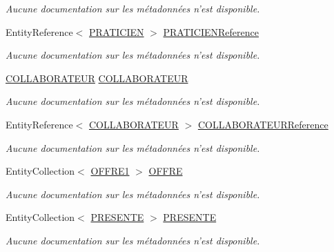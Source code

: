 \begin{DoxyCompactItemize}
\begin{DoxyCompactList}\small\item\em Aucune documentation sur les métadonnées n'est disponible. \end{DoxyCompactList}\item 
Entity\-Reference$<$ \hyperlink{class_model_1_1_p_r_a_t_i_c_i_e_n}{P\-R\-A\-T\-I\-C\-I\-E\-N} $>$ \hyperlink{class_model_1_1_r_a_p_p_o_r_t___d_e___v_i_s_i_t_e_a54eeb4d8f7c4a50370f1803ba841a36a}{P\-R\-A\-T\-I\-C\-I\-E\-N\-Reference}
\begin{DoxyCompactList}\small\item\em Aucune documentation sur les métadonnées n'est disponible. \end{DoxyCompactList}\item 
\hyperlink{class_model_1_1_c_o_l_l_a_b_o_r_a_t_e_u_r}{C\-O\-L\-L\-A\-B\-O\-R\-A\-T\-E\-U\-R} \hyperlink{class_model_1_1_r_a_p_p_o_r_t___d_e___v_i_s_i_t_e_ae2e3abe90339d6fbacb2990f382c9380}{C\-O\-L\-L\-A\-B\-O\-R\-A\-T\-E\-U\-R}
\begin{DoxyCompactList}\small\item\em Aucune documentation sur les métadonnées n'est disponible. \end{DoxyCompactList}\item 
Entity\-Reference$<$ \hyperlink{class_model_1_1_c_o_l_l_a_b_o_r_a_t_e_u_r}{C\-O\-L\-L\-A\-B\-O\-R\-A\-T\-E\-U\-R} $>$ \hyperlink{class_model_1_1_r_a_p_p_o_r_t___d_e___v_i_s_i_t_e_a14d1d3b1a7760c1c07bd940a84cb3a32}{C\-O\-L\-L\-A\-B\-O\-R\-A\-T\-E\-U\-R\-Reference}
\begin{DoxyCompactList}\small\item\em Aucune documentation sur les métadonnées n'est disponible. \end{DoxyCompactList}\item 
Entity\-Collection$<$ \hyperlink{class_model_1_1_o_f_f_r_e1}{O\-F\-F\-R\-E1} $>$ \hyperlink{class_model_1_1_r_a_p_p_o_r_t___d_e___v_i_s_i_t_e_a366487e6a939936711605d454b16a332}{O\-F\-F\-R\-E}
\begin{DoxyCompactList}\small\item\em Aucune documentation sur les métadonnées n'est disponible. \end{DoxyCompactList}\item 
Entity\-Collection$<$ \hyperlink{class_model_1_1_p_r_e_s_e_n_t_e}{P\-R\-E\-S\-E\-N\-T\-E} $>$ \hyperlink{class_model_1_1_r_a_p_p_o_r_t___d_e___v_i_s_i_t_e_a78d24aba4a7730f7dcd96bc508376855}{P\-R\-E\-S\-E\-N\-T\-E}
\begin{DoxyCompactList}\small\item\em Aucune documentation sur les métadonnées n'est disponible. \end{DoxyCompactList}\end{DoxyCompactItemize}


